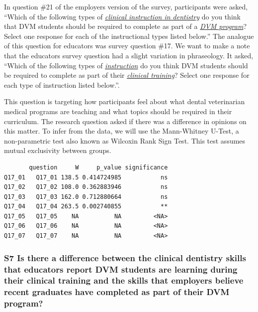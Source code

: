 \documentclass[
  11pt,
  letterpaper,
  DIV=11,
  numbers=noendperiod]{scrartcl}
\begin{document}
In question \#21 of the employers version of the survey, participants
were asked, ``Which of the following types of \ul{\emph{clinical
instruction in dentistry}} do you think that DVM students should be
required to complete as part of a \ul{\emph{DVM program}}? Select one
response for each of the instructional types listed below.'' The
analogue of this question for educators was survey question \#17. We
want to make a note that the educators survey question had a slight
variation in phraseology. It asked, ``Which of the following types of
\ul{\emph{instruction}} do you think DVM students should be required to
complete as part of their \ul{\emph{clinical training}}? Select one
response for each type of instruction listed below.''.

This question is targeting how participants feel about what dental
veterinarian medical programs are teaching and what topics should be
required in their curriculum. The research question asked if there was a
difference in opinions on this matter. To infer from the data, we will
use the Mann-Whitney U-Test, a non-parametric test also known as
Wilcoxin Rank Sign Test. This test assumes mutual exclusivity between
groups.

\begin{verbatim}
       question     W     p_value significance
Q17_01   Q17_01 138.5 0.414724985           ns
Q17_02   Q17_02 108.0 0.362883946           ns
Q17_03   Q17_03 162.0 0.712880664           ns
Q17_04   Q17_04 263.5 0.002740855           **
Q17_05   Q17_05    NA          NA         <NA>
Q17_06   Q17_06    NA          NA         <NA>
Q17_07   Q17_07    NA          NA         <NA>
\end{verbatim}

\hypertarget{s7-is-there-a-difference-between-the-clinical-dentistry-skills-that-educators-report-dvm-students-are-learning-during-their-clinical-training-and-the-skills-that-employers-believe-recent-graduates-have-completed-as-part-of-their-dvm-program}{%
\subsubsection{S7 Is there a difference between the clinical dentistry
skills that educators report DVM students are learning during their
clinical training and the skills that employers believe recent graduates
have completed as part of their DVM
program?}\label{s7-is-there-a-difference-between-the-clinical-dentistry-skills-that-educators-report-dvm-students-are-learning-during-their-clinical-training-and-the-skills-that-employers-believe-recent-graduates-have-completed-as-part-of-their-dvm-program}}
\end{document}
